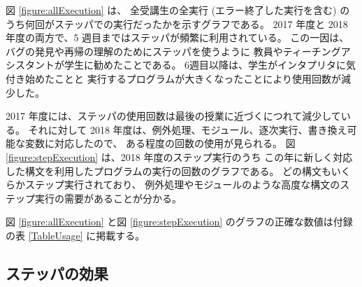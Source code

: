 図 \ref{figure:allExecution} は、
全受講生の全実行 (エラー終了した実行を含む) のうち何回がステッパでの実行だったかを示すグラフである。
2017 年度と 2018 年度の両方で、5 週目まではステッパが頻繁に利用されている。
この一因は、バグの発見や再帰の理解のためにステッパを使うように
教員やティーチングアシスタントが学生に勧めたことである。
6週目以降は、学生がインタプリタに気付き始めたことと
実行するプログラムが大きくなったことにより使用回数が減少した。

2017 年度には、ステッパの使用回数は最後の授業に近づくにつれて減少している。
それに対して 2018 年度は、例外処理、モジュール、逐次実行、書き換え可能な変数に対応したので、
ある程度の回数の使用が見られる。
図 \ref{figure:stepExecution} は、2018 年度のステップ実行のうち
この年に新しく対応した構文を利用したプログラムの実行の回数のグラフである。
どの構文もいくらかステップ実行されており、
例外処理やモジュールのような高度な構文のステップ実行の需要があることが分かる。

図 \ref{figure:allExecution} と図 \ref{figure:stepExecution}
のグラフの正確な数値は付録の表 \ref{TableUsage} に掲載する。

\subsection{ステッパの効果}
\label{subsection:result__effects}

